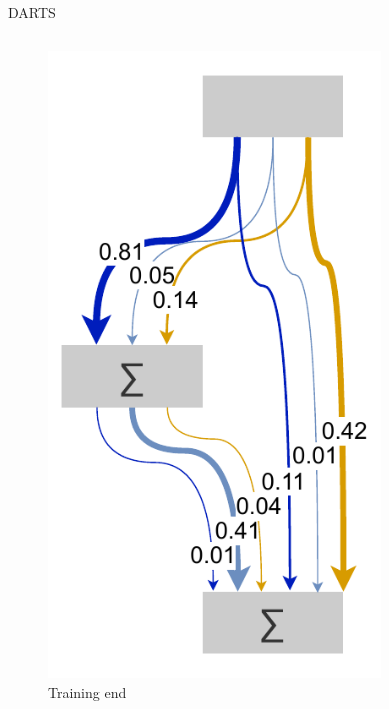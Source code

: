 \documentclass[]{beamer}
\begin{document}
\begin{frame}{DARTS}
\begin{columns}
\begin{column}{.3\textwidth}
\begin{figure}
	\includegraphics[scale=0.4, center]{graphics/darts_2.pdf}
	\caption{Training end}
\end{figure}
\end{column}
\begin{column}{.35\textwidth}
\begin{figure}

\end{figure}
\end{column}
\end{columns}
\end{frame}
\end{document}
